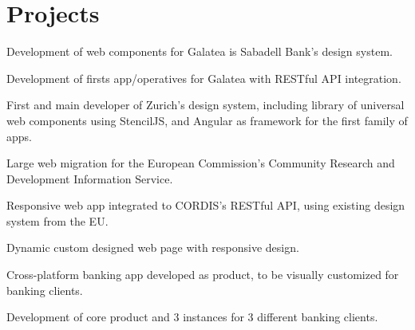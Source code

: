 \documentclass[]{plushcv}
\begin{document}
\begin{minipage}[t]{0.70\textwidth}
\section{Projects}

\begin{tightemize}
\item Development of web components for Galatea is Sabadell Bank's design system.  
\item Development of firsts app/operatives for Galatea with RESTful API integration.  
\end{tightemize}
\sectionsep

\begin{tightemize}
\item First and main developer of Zurich's design system, including library of universal web components using StencilJS, and Angular as framework for the first family of apps.  
\end{tightemize}
\sectionsep

\begin{tightemize}
\item Large web migration for the European Commission's Community Research and Development Information Service.
\item Responsive web app integrated to CORDIS's RESTful API, using existing design system from the EU.
\end{tightemize}
\sectionsep

\begin{tightemize}
\item Dynamic custom designed web page with responsive design.
\end{tightemize}
\sectionsep

\begin{tightemize}
\item Cross-platform banking app developed as product, to be visually customized for banking clients.
\item Development of core product and 3 instances for 3 different banking clients.
\end{tightemize}
\sectionsep


\end{minipage}
\end{document}
